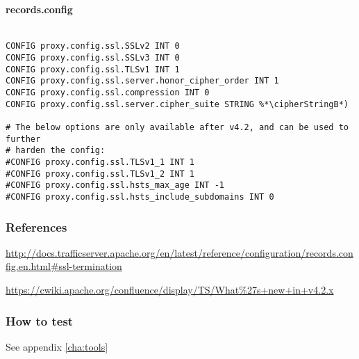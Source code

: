 \paragraph*{records.config}
\begin{lstlisting}

CONFIG proxy.config.ssl.SSLv2 INT 0
CONFIG proxy.config.ssl.SSLv3 INT 0
CONFIG proxy.config.ssl.TLSv1 INT 1
CONFIG proxy.config.ssl.server.honor_cipher_order INT 1
CONFIG proxy.config.ssl.compression INT 0
CONFIG proxy.config.ssl.server.cipher_suite STRING %*\cipherStringB*)

# The below options are only available after v4.2, and can be used to further
# harden the config:
#CONFIG proxy.config.ssl.TLSv1_1 INT 1
#CONFIG proxy.config.ssl.TLSv1_2 INT 1
#CONFIG proxy.config.ssl.hsts_max_age INT -1
#CONFIG proxy.config.ssl.hsts_include_subdomains INT 0
\end{lstlisting}

\subsubsection{References} 
\begin{itemize*}
  \item \url{http://docs.trafficserver.apache.org/en/latest/reference/configuration/records.config.en.html#ssl-termination}
  \item \url{https://cwiki.apache.org/confluence/display/TS/What\%27s+new+in+v4.2.x}
\end{itemize*}

\subsubsection{How to test}
See appendix \ref{cha:tools}
